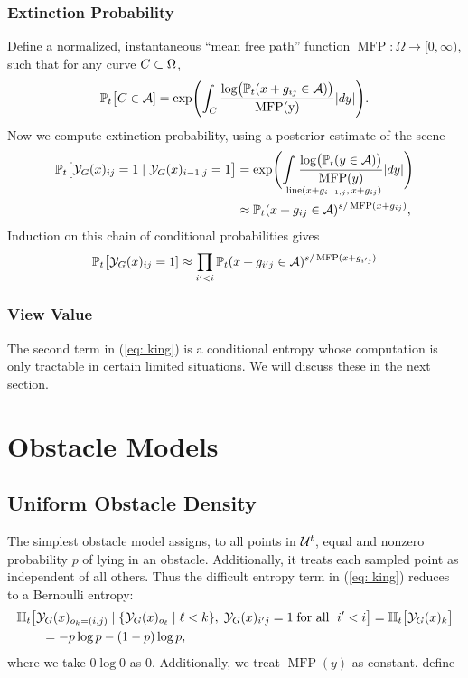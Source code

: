 \subsubsection{Extinction Probability}
Define a normalized, instantaneous ``mean free path'' function 
$\operatorname{MFP}:\Omega\to[0,\infty)$, such that 
for any curve $C\subset\Omega$,
$$
\mathbb{P}_t\bigl[C\in\mathcal{A}] = \exp\Biggl(\int_C
\frac{\log\bigl(\mathbb{P}_t(x+g_{ij}\in\mathcal{A})\bigr)}{\operatorname{MFP(y)}}|dy|\Biggr).
$$
Now we compute extinction probability, using a posterior estimate of the scene
\begin{align*}
\PP_t\bigl[\Y_G(x)_{ij}=1 \;|\; \Y_G(x)_{i-1,j}=1\big] 
&= \exp\Biggl(\underset{\!\!\!\mathrlap{\text{line}(x+g_{i-1,j},\,x+g_{ij})}}{\int}\; 
\frac{\log\bigl(\PP_t(y\in\A)\bigr)}{\operatorname{MFP}(y)}|dy|\Biggr)\\
&\approx \PP_t(x+g_{ij}\in\A)^{s/\operatorname{MFP}(x+g_{ij})},
\end{align*}
Induction on this chain of conditional probabilities gives
$$\mathbb{P}_t\bigl[\mathcal{Y}_G(x)_{ij}=1] \approx \prod_{i^{\prime}<i} \mathbb{P}_t(x+g_{i^{\prime}j}\in\mathcal{A})^{s/\operatorname{MFP}(x+g_{i^{\prime}j})}$$ 

\subsubsection{View Value}
The second term in (\ref{eq: king}) is a conditional entropy whose computation is only tractable in certain limited situations.
We will discuss these in the next section.

\section{Obstacle Models \label{section: obstacle models}}
\subsection{Uniform Obstacle Density}
The simplest obstacle model assigns, to all points in $\mathcal{U}^t$, 
equal and nonzero probability $p$ of lying in an obstacle.
Additionally, it treats each sampled point as independent of all others.
Thus the difficult entropy term in (\ref{eq: king}) reduces to a Bernoulli entropy:
\begin{align*}
&\mathbb{H}_t\bigl[\mathcal{Y}_G(x)_{o_k=(i,j)}\;|\;
\{\mathcal{Y}_G(x)_{o_{\ell}}\;|\;\ell<k\},\;
\mathcal{Y}_G(x)_{i^{\prime}j}=1\;\text{for all $\;i^{\prime}<i$}
\bigr] = \mathbb{H}_t\bigl[\mathcal{Y}_G(x)_k\bigr] \\
&\qquad=-p\log p - (1-p)\log p,
\end{align*}
where we take $0\log 0$ as 0.  Additionally, we treat $\operatorname{MFP}(y)$ as constant.
define 


